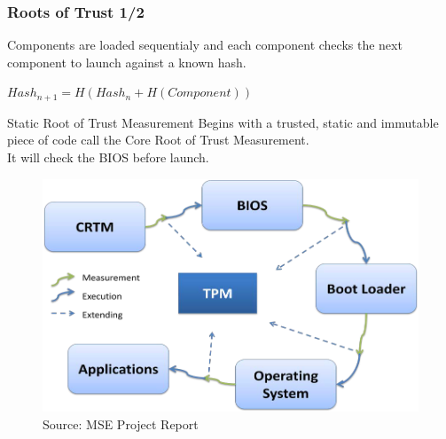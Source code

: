 \documentclass{beamer}
\begin{document}
\begin{frame}
    \frametitle{Roots of Trust 1/2}

    Components are loaded sequentialy and each component checks the next component to launch against a known hash.

    $Hash_{n+1} = H(Hash_{n} + H(Component))$

    \begin{block}{Static Root of Trust Measurement}
        Begins with a trusted, static and immutable piece of code call the Core Root of Trust Measurement.\\
        It will check the BIOS before launch.

        \begin{figure}[htb]
            \centering
            \includegraphics[scale=.15]{assets/srtm}
            \caption{Source: MSE Project Report}
        \end{figure}
    \end{block}
\end{frame}
\end{document}
